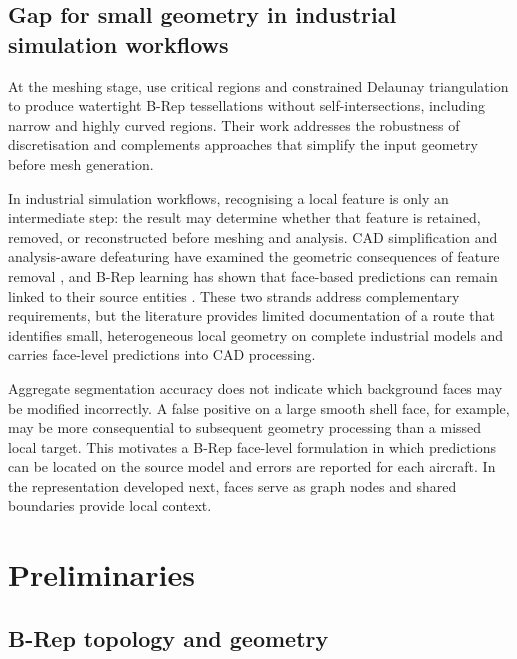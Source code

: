 \documentclass[12pt,a4paper]{article}
\begin{document}
\subsection{Gap for small geometry in industrial simulation workflows}

At the meshing stage, \textcite{li2026robust_tessellation} use critical regions and constrained Delaunay triangulation to produce watertight B-Rep tessellations without self-intersections, including narrow and highly curved regions. Their work addresses the robustness of discretisation and complements approaches that simplify the input geometry before mesh generation.

In industrial simulation workflows, recognising a local feature is only an intermediate step: the result may determine whether that feature is retained, removed, or reconstructed before meshing and analysis. CAD simplification and analysis-aware defeaturing have examined the geometric consequences of feature removal \parencite{thakur2009cad_simplification,antolin2024analysis_aware_defeaturing}, and B-Rep learning has shown that face-based predictions can remain linked to their source entities \parencite{jayaraman2021uvnet,lambourne2021brepnet,yeo2021machining}. These two strands address complementary requirements, but the literature provides limited documentation of a route that identifies small, heterogeneous local geometry on complete industrial models and carries face-level predictions into CAD processing.

Aggregate segmentation accuracy does not indicate which background faces may be modified incorrectly. A false positive on a large smooth shell face, for example, may be more consequential to subsequent geometry processing than a missed local target. This motivates a B-Rep face-level formulation in which predictions can be located on the source model and errors are reported for each aircraft. In the representation developed next, faces serve as graph nodes and shared boundaries provide local context.


\section{Preliminaries}\label{sec:preliminaries}

\subsection{B-Rep topology and geometry}\label{sec:brep_preliminary}
\end{document}
